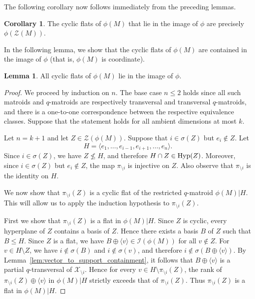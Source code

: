 \documentclass{article}
\theoremstyle{definition}
\newtheorem{corollary}[theorem]{{{Corollary}}}
\newtheorem{lemma}[theorem]{{{Lemma}}}
\begin{document}
The following corollary now follows immediately from the preceding lemmas.

\begin{corollary}\label{cor:CFs_in_image_are_image_of_CFs}
    The cyclic flats of $\phi(M)$ that lie in the image of $\phi$ are precisely $\phi(\mathcal{Z}(M))$.
\end{corollary}

In the following lemma, we show that the cyclic flats of $\phi(M)$ are contained in the image of $\phi$ (that is, $\phi(M)$ is coordinate).

\begin{lemma}\label{lem:CFs_of_q-mat_in_image}
    All cyclic flats of $\phi(M)$ lie in the image of $\phi$.
\end{lemma}

\begin{proof}
    We proceed by induction on $n$. The base case $n\leq 2$ holds since all such matroids and $q$-matroids are respectively transversal and transversal $q$-matroids, and there is a one-to-one correspondence between the respective equivalence classes. Suppose that the statement holds for all ambient dimensions at most $k$.

    Let $n=k+1$ and let $Z\in\mathcal{Z}(\phi(M))$. Suppose that $i\in\sigma(Z)$ but $e_i\notin Z$. Let
    \[
        H=\langle e_1,\dots,e_{i-1},e_{i+1},\dots,e_n\rangle .
    \]
    Since $i\in\sigma(Z)$, we have $Z\not\leq H$, and therefore $H\cap Z\in\textup{Hyp}(Z)$. Moreover, since $i\in\sigma(Z)$ but $e_i\notin Z$, the map $\pi_{\setminus i}$ is injective on $Z$. Also observe that $\pi_{\setminus i}$ is the identity on $H$.

    We now show that $\pi_{\setminus i}(Z)$ is a cyclic flat of the restricted $q$-matroid $\phi(M)|H$. This will allow us to apply the induction hypothesis to $\pi_{\setminus i}(Z)$.

    First we show that $\pi_{\setminus i}(Z)$ is a flat in $\phi(M)|H$. Since $Z$ is cyclic, every hyperplane of $Z$ contains a basis of $Z$. Hence there exists a basis $B$ of $Z$ such that $B\leq H$. Since $Z$ is a flat, we have $B\oplus\langle v\rangle\in\mathcal{I}(\phi(M))$ for all $v\notin Z$. For $v\in H\setminus Z$, we have $i\notin\sigma(B)$ and $i\notin\sigma(v)$, and therefore $i\notin\sigma(B\oplus\langle v\rangle)$. By Lemma~\ref{lem:vector_to_support_containment}, it follows that $B\oplus\langle v\rangle$ is a partial $q$-transversal of $\mathcal{X}_{\setminus i}$. Hence for every $v\in H\setminus\pi_{\setminus i}(Z)$, the rank of $\pi_{\setminus i}(Z)\oplus\langle v\rangle$ in $\phi(M)|H$ strictly exceeds that of $\pi_{\setminus i}(Z)$. Thus $\pi_{\setminus i}(Z)$ is a flat in $\phi(M)|H$.


\end{proof}
\end{document}
